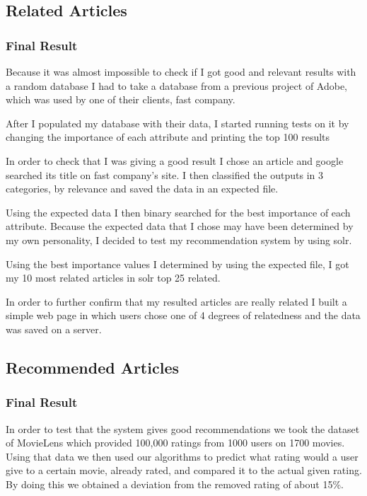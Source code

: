 \subsection{Related Articles}
\label{sec:related-articles}

\subsubsection{Final Result}
\label{sec:final-resultone}
Because it was almost impossible to check if I got good and relevant results with a random database I had to take a database from a previous project of Adobe, which was used by one of their clients, fast company. 

After I populated my database with their data, I started running tests on it by changing the importance of each attribute and printing the top 100 results

In order to check that I was giving a good result I chose an article and google searched its title on fast company’s site. I then classified the outputs in 3 categories, by relevance and saved the data in an expected file.

Using the expected data I then binary searched for the best importance of each attribute.
Because the expected data that I chose may have been determined by my own personality, I decided to test my recommendation system by using solr.

Using the best importance values I determined by using the expected file, I got my 10 most related articles in solr top 25 related.

In order to further confirm that my resulted articles are really related I built a simple web page in which users chose one of 4 degrees of relatedness and the data was saved on a server.

\subsection{Recommended Articles}
\label{sec:recommended-articles}

\subsubsection{Final Result}
\label{sec:final-resultwo}
In order to test that the system gives good recommendations we took the dataset of MovieLens which provided 100,000 ratings from 1000 users on 1700 movies. Using that data we then used our algorithms to predict what rating would a user give to a certain movie, already rated, and compared it to the actual given rating. By doing this we obtained a deviation from the removed rating of about 15\%.

